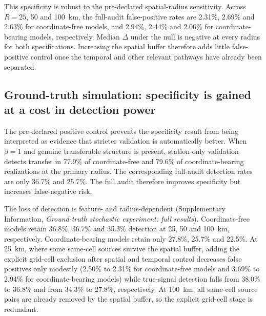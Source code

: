 This specificity is robust to the pre-declared spatial-radius sensitivity. Across $R=25$, 50 and 100~km, the full-audit false-positive rates are 2.31\%, 2.69\% and 2.63\% for coordinate-free models, and 2.94\%, 2.44\% and 2.06\% for coordinate-bearing models, respectively. Median $\Delta$ under the null is negative at every radius for both specifications. Increasing the spatial buffer therefore adds little false-positive control once the temporal and other relevant pathways have already been separated.



\subsection{Ground-truth simulation: specificity is gained at a cost in detection power}

The pre-declared positive control prevents the specificity result from being interpreted as evidence that stricter validation is automatically better. When $\beta=1$ and genuine transferable structure is present, station-only validation detects transfer in 77.9\% of coordinate-free and 79.6\% of coordinate-bearing realizations at the primary radius. The corresponding full-audit detection rates are only 36.7\% and 25.7\%. The full audit therefore improves specificity but increases false-negative risk.

The loss of detection is feature- and radius-dependent (Supplementary Information, \emph{Ground-truth stochastic experiment: full results}). Coordinate-free models retain 36.8\%, 36.7\% and 35.3\% detection at 25, 50 and 100~km, respectively. Coordinate-bearing models retain only 27.8\%, 25.7\% and 22.5\%. At 25~km, where some same-cell sources survive the spatial buffer, adding the explicit grid-cell exclusion after spatial and temporal control decreases false positives only modestly (2.50\% to 2.31\% for coordinate-free models and 3.69\% to 2.94\% for coordinate-bearing models) while true-signal detection falls from 38.0\% to 36.8\% and from 34.3\% to 27.8\%, respectively. At 100~km, all same-cell source pairs are already removed by the spatial buffer, so the explicit grid-cell stage is redundant.

